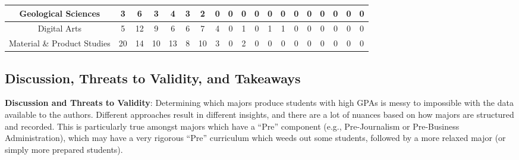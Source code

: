 \documentclass[10pt]{article}
\begin{document}
\begin{landscape}
\begin{longtable}[c]{|ccccccccccccccccccc|}
	\multicolumn{1}{|c|}{Geological Sciences}                        & \multicolumn{1}{c|}{3}          & \multicolumn{1}{c|}{6}          & \multicolumn{1}{c|}{3}          & \multicolumn{1}{c|}{4}          & \multicolumn{1}{c|}{3}          & \multicolumn{1}{c|}{2}          & \multicolumn{1}{c|}{0}          & \multicolumn{1}{c|}{0}          & \multicolumn{1}{c|}{0}          & \multicolumn{1}{c|}{0}          & \multicolumn{1}{c|}{0}          & \multicolumn{1}{c|}{0}          & \multicolumn{1}{c|}{0}          & \multicolumn{1}{c|}{0}          & \multicolumn{1}{c|}{0}          & \multicolumn{1}{c|}{0}          & \multicolumn{1}{c|}{0}          & 0          \\ \hline
	\multicolumn{1}{|c|}{Digital Arts}                               & \multicolumn{1}{c|}{5}          & \multicolumn{1}{c|}{12}         & \multicolumn{1}{c|}{9}          & \multicolumn{1}{c|}{6}          & \multicolumn{1}{c|}{6}          & \multicolumn{1}{c|}{7}          & \multicolumn{1}{c|}{4}          & \multicolumn{1}{c|}{0}          & \multicolumn{1}{c|}{1}          & \multicolumn{1}{c|}{0}          & \multicolumn{1}{c|}{1}          & \multicolumn{1}{c|}{1}          & \multicolumn{1}{c|}{0}          & \multicolumn{1}{c|}{0}          & \multicolumn{1}{c|}{0}          & \multicolumn{1}{c|}{0}          & \multicolumn{1}{c|}{0}          & 0          \\ \hline
	\multicolumn{1}{|c|}{Material \& Product Studies}                & \multicolumn{1}{c|}{20}         & \multicolumn{1}{c|}{14}         & \multicolumn{1}{c|}{10}         & \multicolumn{1}{c|}{13}         & \multicolumn{1}{c|}{8}          & \multicolumn{1}{c|}{10}         & \multicolumn{1}{c|}{3}          & \multicolumn{1}{c|}{0}          & \multicolumn{1}{c|}{2}          & \multicolumn{1}{c|}{0}          & \multicolumn{1}{c|}{0}          & \multicolumn{1}{c|}{0}          & \multicolumn{1}{c|}{0}          & \multicolumn{1}{c|}{0}          & \multicolumn{1}{c|}{0}          & \multicolumn{1}{c|}{0}          & \multicolumn{1}{c|}{0}          & 0          \\ \hline
\end{longtable}

\end{landscape}

\normalsize
\subsection{Discussion, Threats to Validity, and Takeaways}

\textbf{Discussion and Threats to Validity}: Determining which majors produce students with high GPAs is messy to impossible with the data available to the authors. Different approaches result in different insights, and there are a lot of nuances based on how majors are structured and recorded. This is  particularly true amongst majors which have a ``Pre'' component (e.g., Pre-Journalism or Pre-Business Administration), which may have a very rigorous ``Pre'' curriculum which weeds out some students, followed by a more relaxed major (or simply more prepared students).
\end{document}
